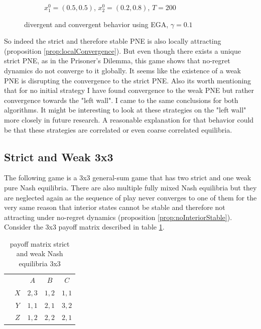 \begin{figure}[H]
\begin{subfigure}{.5\textwidth}
    \caption{$x_{1}^0 = (0.5,0.5)$, $x_{2}^0 = (0.2,0.8)$, $T = 200$}
    \label{fig:Weak3b}
\end{subfigure}
\caption{divergent and convergent behavior using EGA, $\gamma = 0.1$}
\label{fig:2x2Weak3}
\end{figure}

So indeed the strict and therefore stable PNE is also locally attracting (proposition \ref{prop:localConvergence}). But even though there exists a unique strict PNE, as in the Prisoner's Dilemma, this game shows that no-regret dynamics do not converge to it globally. It seems like the existence of a weak PNE is disrupting the convergence to the strict PNE. Also its worth mentioning that for no initial strategy I have found convergence to the weak PNE but rather convergence towards the "left wall". I came to the same conclusions for both algorithms. It might be interesting to look at these strategies on the "left wall" more closely in future research. A reasonable explanation for that behavior could be that these strategies are correlated or even coarse correlated equilibria. 


\subsection{Strict and Weak 3x3}\label{subsection:StrictAndWeak3x3}

The following game is a 3x3 general-sum game that has two strict and one weak pure Nash equilibria. There are also multiple fully mixed Nash equilibria but they are neglected again as the sequence of play never converges to one of them for the very same reason that interior states cannot be stable and therefore not attracting under no-regret dynamics (proposition \ref{prop:noInteriorStable}). Consider the 3x3 payoff matrix described in table \ref{tab:payoffStrictAndWeak3x3}. 

\begin{table}[H]\centering
\setlength{\extrarowheight}{2pt}
\begin{tabular}{cc|c|c|c|}
  & \multicolumn{1}{c}{} & \multicolumn{1}{c}{$A$}  & \multicolumn{1}{c}{$B$}  & \multicolumn{1}{c}{$C$} \\\cline{3-5}
            & $X$ & $2,3$ & $1,2$ & $1,1$ \\ \cline{3-5}
            & $Y$ & $1,1$ & $2,1$ & $3,2$ \\\cline{3-5}
            & $Z$ & $1,2$ & $2,2$ & $2,1$ \\\cline{3-5}
\end{tabular}\caption{\label{tab:payoffStrictAndWeak3x3}payoff matrix strict and weak Nash equilibria 3x3}
\end{table}

